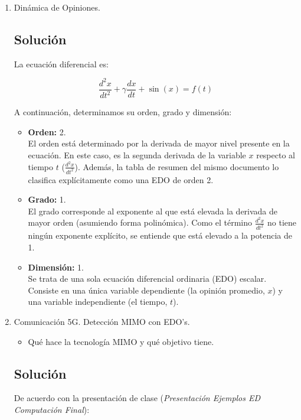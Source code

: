 \begin{enumerate}[label=\arabic*., leftmargin=*]
    \item Dinámica de Opiniones.
    \subsection{Solución}

    La ecuación diferencial es:

    \[ \frac{d^2x}{dt^2} + \gamma \frac{dx}{dt} + \sin(x) = f(t) \]

    A continuación, determinamos su orden, grado y dimensión:

    \begin{itemize}[leftmargin=*]
        \item \textbf{Orden:} 2.\\
        El orden está determinado por la derivada de mayor nivel presente en la ecuación. En este caso, es la segunda derivada de la variable $x$ respecto al tiempo $t$ ($\frac{d^2x}{dt^2}$). Además, la tabla de resumen del mismo documento lo clasifica explícitamente como una EDO de orden 2.

        \item \textbf{Grado:} 1.\\
        El grado corresponde al exponente al que está elevada la derivada de mayor orden (asumiendo forma polinómica). Como el término $\frac{d^2x}{dt^2}$ no tiene ningún exponente explícito, se entiende que está elevado a la potencia de 1.

        \item \textbf{Dimensión:} 1.\\
        Se trata de una sola ecuación diferencial ordinaria (EDO) escalar. Consiste en una única variable dependiente (la opinión promedio, $x$) y una variable independiente (el tiempo, $t$).
    \end{itemize}
    
    \item Comunicación 5G. Detección MIMO con EDO's.
    \begin{itemize}[leftmargin=*]
        \item Qué hace la tecnología MIMO y qué objetivo tiene.
    \end{itemize}

    \subsection{Solución}

    De acuerdo con la presentación de clase (\textit{Presentación Ejemplos ED Computación Final}):


\end{enumerate}
